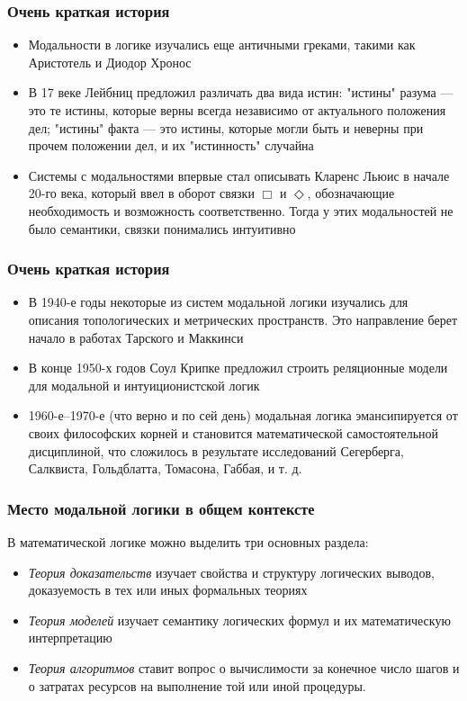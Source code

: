 \documentclass[pdf,utf8,russian,aspectratio=169]{beamer}
\begin{document}
\begin{frame}
  \frametitle{Очень краткая история}

  \begin{itemize}
    \item Модальности в логике изучались еще античными греками, такими как Аристотель и Диодор Хронос
    \item В 17 веке Лейбниц предложил различать два вида истин: "истины" разума --- это те истины, которые верны всегда независимо от актуального положения дел; "истины" факта --- это истины, которые могли быть и неверны при прочем положении дел, и их "истинность" случайна
    \item Системы с модальностями впервые стал описывать Кларенс Льюис в начале 20-го века, который ввел в оборот связки $\Box$ и $\Diamond$, обозначающие необходимость и возможность соответственно. Тогда у этих модальностей не было семантики, связки понимались интуитивно
  \end{itemize}
\end{frame}

\begin{frame}
  \frametitle{Очень краткая история}
  \begin{itemize}
  \item В 1940-е годы некоторые из систем модальной логики изучались для описания топологических и метрических пространств. Это направление берет начало в работах Тарского и Маккинси
  \item В конце 1950-х годов Соул Крипке предложил строить реляционные модели для модальной и интуиционистской логик
  \item 1960-е--1970-е (что верно и по сей день) модальная логика эмансипируется от своих философских корней и становится математической самостоятельной дисциплиной, что сложилось в результате исследований Сегерберга, Салквиста, Гольдблатта, Томасона, Габбая, и т. д.
  \end{itemize}
\end{frame}

\begin{frame}
  \frametitle{Место модальной логики в общем контексте}

  В математической логике можно выделить три основных раздела:

  \begin{itemize}
    \item \emph{Теория доказательств} изучает свойства и структуру логических выводов, доказуемость в тех или иных формальных
    теориях
    \item \emph{Теория моделей} изучает семантику логических формул и их математическую интерпретацию
    \item \emph{Теория алгоритмов} ставит вопрос о вычислимости за конечное число шагов и о затратах ресурсов на выполнение той или иной процедуры.
  \end{itemize}
\end{frame}
\end{document}
